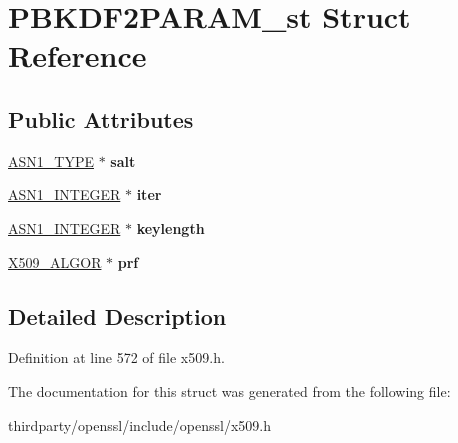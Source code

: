 \hypertarget{struct_p_b_k_d_f2_p_a_r_a_m__st}{}\section{P\+B\+K\+D\+F2\+P\+A\+R\+A\+M\+\_\+st Struct Reference}
\label{struct_p_b_k_d_f2_p_a_r_a_m__st}
\subsection*{Public Attributes}
\begin{DoxyCompactItemize}
\item 
\mbox{\label{struct_p_b_k_d_f2_p_a_r_a_m__st_aa81f35e6d5ec790f7265b17be3a6d163}} 
\hyperlink{structasn1__type__st}{A\+S\+N1\+\_\+\+T\+Y\+PE} $\ast$ {\bfseries salt}
\item 
\mbox{\label{struct_p_b_k_d_f2_p_a_r_a_m__st_a8ff00adf7617aa97d36fdd4b6fdbaf0f}} 
\hyperlink{structasn1__string__st}{A\+S\+N1\+\_\+\+I\+N\+T\+E\+G\+ER} $\ast$ {\bfseries iter}
\item 
\mbox{\label{struct_p_b_k_d_f2_p_a_r_a_m__st_a0d7609db9885ce6ab331668123b09a2c}} 
\hyperlink{structasn1__string__st}{A\+S\+N1\+\_\+\+I\+N\+T\+E\+G\+ER} $\ast$ {\bfseries keylength}
\item 
\mbox{\label{struct_p_b_k_d_f2_p_a_r_a_m__st_ac2bdfe036b70c95d5b58e61c1b786fc1}} 
\hyperlink{struct_x509__algor__st}{X509\+\_\+\+A\+L\+G\+OR} $\ast$ {\bfseries prf}
\end{DoxyCompactItemize}


\subsection{Detailed Description}


Definition at line 572 of file x509.\+h.



The documentation for this struct was generated from the following file\+:\begin{DoxyCompactItemize}
\item 
thirdparty/openssl/include/openssl/x509.\+h\end{DoxyCompactItemize}
